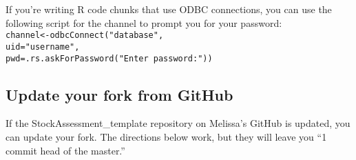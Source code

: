 \documentclass[12pt,]{article}
\begin{document}
If you're writing R code chunks that use ODBC connections, you can use
the following script for the channel to prompt you for your password:\\
\texttt{channel\textless{}-odbcConnect("database",}\\
\hspace*{0.333em}\hspace*{0.333em}\hspace*{0.333em}\hspace*{0.333em}\hspace*{0.333em}\hspace*{0.333em}\hspace*{0.333em}\hspace*{0.333em}\hspace*{0.333em}\hspace*{0.333em}\hspace*{0.333em}\texttt{uid="username",}\\
\hspace*{0.333em}\hspace*{0.333em}\hspace*{0.333em}\hspace*{0.333em}\hspace*{0.333em}\hspace*{0.333em}\hspace*{0.333em}\hspace*{0.333em}\hspace*{0.333em}\hspace*{0.333em}\hspace*{0.333em}\texttt{pwd=.rs.askForPassword("Enter\ password:"))}

\subsection{Update your fork from
GitHub}\label{update-your-fork-from-github}

If the StockAssessment\_template repository on Melissa's GitHub is
updated, you can update your fork. The directions below work, but they
will leave you ``1 commit head of the master.''
\end{document}
